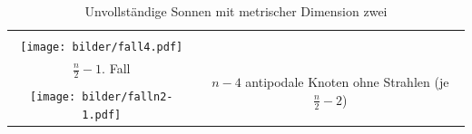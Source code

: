 \begin{table}[htp]
\begin{tabularx}{\textwidth}{||c|c||}
\cline{1-1}
\vspace{-6mm}&\\
\texttt{[image: bilder/fall4.pdf]}&\\
\hline\hline
\vspace{0.3mm}
$\frac{n}{2}-1$. Fall&\multirow{3}{121mm}{$n-4$ antipodale Knoten ohne Strahlen (je $\frac{n}{2}-2$)}\\
\cline{1-1}
\vspace{-6mm}&\\
\texttt{[image: bilder/falln2-1.pdf]}&\\
\hline\hline
\end{tabularx}
\caption{Unvollständige Sonnen mit metrischer Dimension zwei}
\label{fallunterscheidungungeradesonnen2md}
\end{table}
\newpage
